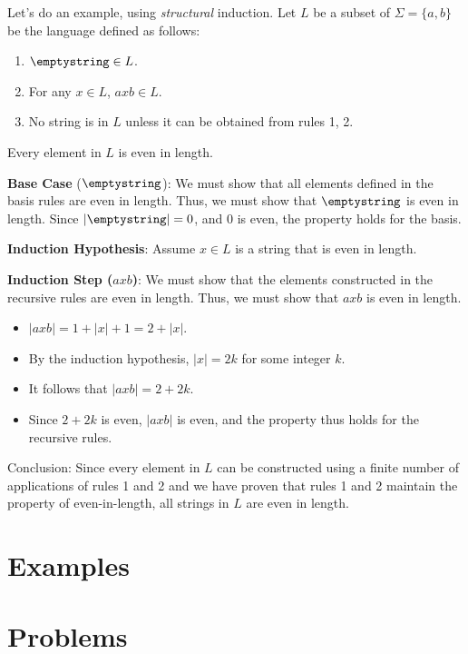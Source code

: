 Let's do an example, using \emph{structural} induction.
Let $L$ be a subset of $\Sigma = \{a,b\}$ be the language defined as follows:
\begin{enumerate}
	\item $\emptystring \in L$.
	\item For any $x \in L$, $axb \in L$.
	\item No string is in $L$ unless it can be obtained from rules 1, 2.
\end{enumerate}

\begin{claim}
Every element in $L$ is even in length.
\end{claim}

\begin{proofstructuralinduction}

	\textbf{Base Case} ($\emptystring$): We must show that all elements defined in the basis rules are even in length. Thus, we must show that $\emptystring$ is even in length. Since $|\emptystring| = 0$, and 0 is even, the property holds for the basis.
	
	\textbf{Induction Hypothesis}: Assume $x \in L$ is a string that is even in length.
	
	\textbf{Induction Step ($axb$)}: We must show that the elements constructed in the recursive rules are even in length.
	Thus, we must show that $axb$ is even in length.
	\begin{itemize}
		\item $|axb| = 1 + |x| + 1 = 2 + |x|$.
		\item By the induction hypothesis, $|x| = 2k$ for some integer $k$.
		\item It follows that $|axb| = 2 + 2k$.
		\item Since $2+2k$ is even, $|axb|$ is even, and the property thus holds for the recursive rules.
	\end{itemize}

	\item Conclusion: Since every element in $L$ can be constructed using a finite number of applications of rules 1 and 2 and we have proven that rules 1 and 2 maintain the property of even-in-length, all strings in $L$ are even in length.
	
\end{proofstructuralinduction}



\section{Examples}

\section{Problems}